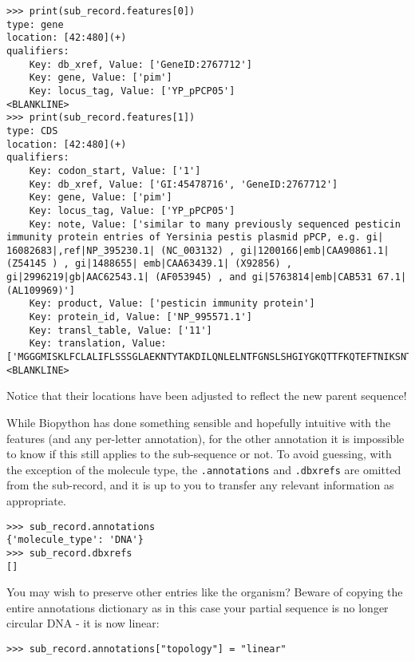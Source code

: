 \begin{verbatim}
>>> print(sub_record.features[0])
type: gene
location: [42:480](+)
qualifiers:
    Key: db_xref, Value: ['GeneID:2767712']
    Key: gene, Value: ['pim']
    Key: locus_tag, Value: ['YP_pPCP05']
<BLANKLINE>
>>> print(sub_record.features[1])
type: CDS
location: [42:480](+)
qualifiers:
    Key: codon_start, Value: ['1']
    Key: db_xref, Value: ['GI:45478716', 'GeneID:2767712']
    Key: gene, Value: ['pim']
    Key: locus_tag, Value: ['YP_pPCP05']
    Key: note, Value: ['similar to many previously sequenced pesticin immunity protein entries of Yersinia pestis plasmid pPCP, e.g. gi| 16082683|,ref|NP_395230.1| (NC_003132) , gi|1200166|emb|CAA90861.1| (Z54145 ) , gi|1488655| emb|CAA63439.1| (X92856) , gi|2996219|gb|AAC62543.1| (AF053945) , and gi|5763814|emb|CAB531 67.1| (AL109969)']
    Key: product, Value: ['pesticin immunity protein']
    Key: protein_id, Value: ['NP_995571.1']
    Key: transl_table, Value: ['11']
    Key: translation, Value: ['MGGGMISKLFCLALIFLSSSGLAEKNTYTAKDILQNLELNTFGNSLSHGIYGKQTTFKQTEFTNIKSNTKKHIALINKDNSWMISLKILGIKRDEYTVCFEDFSLIRPPTYVAIHPLLIKKVKSGNFIVVKEIKKSIPGCTVYYH']
<BLANKLINE>
\end{verbatim}

\noindent Notice that their locations have been adjusted to reflect the new parent sequence!

While Biopython has done something sensible and hopefully intuitive with the
features (and any per-letter annotation), for the other annotation it is
impossible to know if this still applies to the sub-sequence or not. To avoid
guessing, with the exception of the molecule type, the \texttt{.annotations}
and \texttt{.dbxrefs} are omitted from the sub-record, and it is up to you to
transfer any relevant information as appropriate.

\begin{verbatim}
>>> sub_record.annotations
{'molecule_type': 'DNA'}
>>> sub_record.dbxrefs
[]
\end{verbatim}

\noindent
You may wish to preserve other entries like the organism? Beware of copying
the entire annotations dictionary as in this case your partial sequence is no
longer circular DNA - it is now linear:

\begin{verbatim}
>>> sub_record.annotations["topology"] = "linear"
\end{verbatim}

